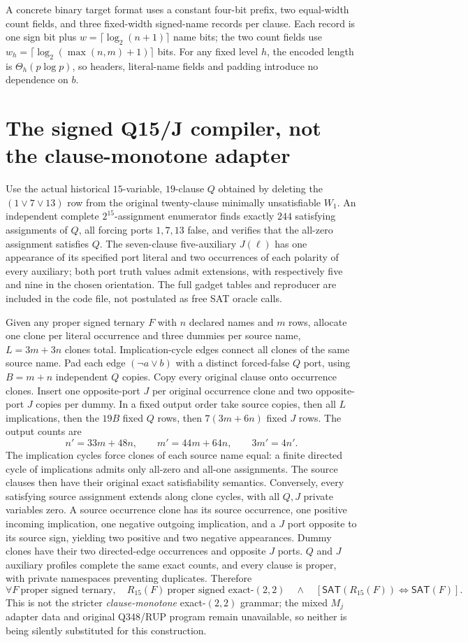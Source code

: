 \documentclass[11pt]{article}
\newcommand{\SAT}{\mathsf{SAT}}
\begin{document}
A concrete binary target format uses a constant four-bit prefix, two equal-width count fields, and three fixed-width signed-name records per clause. Each record is one sign bit plus $w=\lceil\log_2(n+1)\rceil$ name bits; the two count fields use $w_h=\lceil\log_2(\max(n,m)+1)\rceil$ bits. For any fixed level $h$, the encoded length is $\Theta_h(p\log p)$, so headers, literal-name fields and padding introduce no dependence on $b$.

\section{The signed Q15/J compiler, not the clause-monotone adapter}
Use the actual historical $15$-variable, $19$-clause $Q$ obtained by deleting the $(1\vee7\vee13)$ row from the original twenty-clause minimally unsatisfiable $W_1$. An independent complete $2^{15}$-assignment enumerator finds exactly $244$ satisfying assignments of $Q$, all forcing ports $1,7,13$ false, and verifies that the all-zero assignment satisfies $Q$. The seven-clause five-auxiliary $J(\ell)$ has one appearance of its specified port literal and two occurrences of each polarity of every auxiliary; both port truth values admit extensions, with respectively five and nine in the chosen orientation. The full gadget tables and reproducer are included in the code file, not postulated as free SAT oracle calls.

Given any proper signed ternary $F$ with $n$ declared names and $m$ rows, allocate one clone per literal occurrence and three dummies per source name, $L=3m+3n$ clones total. Implication-cycle edges connect all clones of the same source name. Pad each edge $(\neg a\vee b)$ with a distinct forced-false $Q$ port, using $B=m+n$ independent $Q$ copies. Copy every original clause onto occurrence clones. Insert one opposite-port $J$ per original occurrence clone and two opposite-port $J$ copies per dummy. In a fixed output order take source copies, then all $L$ implications, then the $19B$ fixed $Q$ rows, then $7(3m+6n)$ fixed $J$ rows. The output counts are
\[
 n'=33m+48n,\qquad m'=44m+64n,\qquad 3m'=4n'.
\tag{2}
\]
The implication cycles force clones of each source name equal: a finite directed cycle of implications admits only all-zero and all-one assignments. The source clauses then have their original exact satisfiability semantics. Conversely, every satisfying source assignment extends along clone cycles, with all $Q,J$ private variables zero. A source occurrence clone has its source occurrence, one positive incoming implication, one negative outgoing implication, and a $J$ port opposite to its source sign, yielding two positive and two negative appearances. Dummy clones have their two directed-edge occurrences and opposite $J$ ports. $Q$ and $J$ auxiliary profiles complete the same exact counts, and every clause is proper, with private namespaces preventing duplicates. Therefore
\[
 \forall F\ \text{proper signed ternary},\quad
 R_{15}(F)\ \text{proper signed exact-}(2,2)\quad\land\quad
 [\SAT(R_{15}(F))\iff\SAT(F)].
\tag{3}
\]
This is not the stricter \emph{clause-monotone} exact-$(2,2)$ grammar; the mixed $M_j$ adapter data and original Q348/RUP program remain unavailable, so neither is being silently substituted for this construction.
\end{document}
